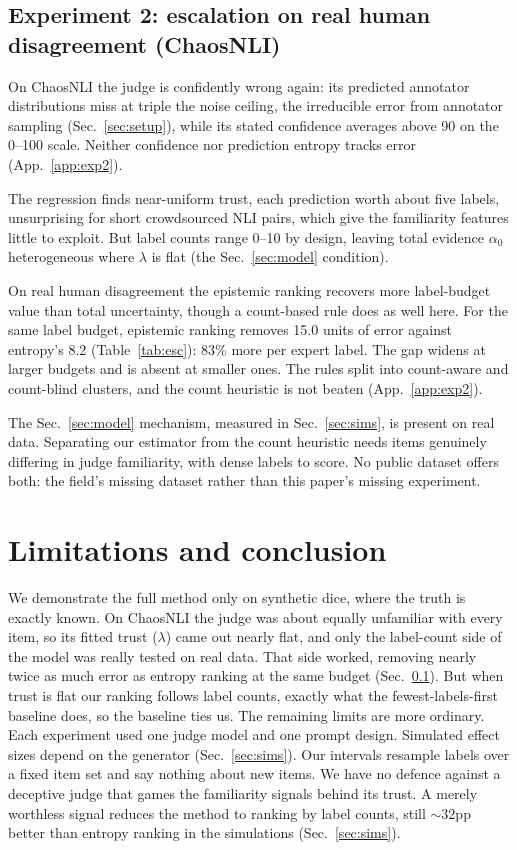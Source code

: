 \documentclass{article}
\newcommand{\secref}[1]{Sec.~\ref{#1}}
\begin{document}
\subsection{Experiment 2: escalation on real human disagreement (ChaosNLI)}
\label{sec:exp2}

On ChaosNLI the judge is confidently wrong again: its predicted annotator
distributions miss at triple the noise ceiling, the irreducible error from
annotator sampling (\secref{sec:setup}), while its stated confidence
averages above 90 on the 0--100 scale. Neither confidence nor prediction
entropy tracks error (App.~\ref{app:exp2}).

The regression finds near-uniform trust, each prediction worth about five
labels, unsurprising for short crowdsourced NLI pairs, which give the
familiarity features little to exploit. But label counts range 0--10 by design,
leaving total evidence $\alpha_0$ heterogeneous where $\lambda$ is flat (the
\secref{sec:model} condition).

On real human disagreement the epistemic ranking recovers more label-budget
value than total uncertainty, though a count-based rule does as well here.
For the same label budget, epistemic ranking removes 15.0 units of error
against entropy's 8.2 (Table~\ref{tab:esc}): 83\% more per expert label. The
gap widens at larger budgets and is absent at smaller ones. The rules split into
count-aware and count-blind clusters, and the count heuristic is not beaten
(App.~\ref{app:exp2}).

The \secref{sec:model} mechanism, measured in \secref{sec:sims}, is present on
real data. Separating our estimator from the count heuristic needs items genuinely
differing in judge familiarity, with dense labels to score. No public
dataset offers both: the field's missing dataset rather than this paper's missing
experiment.

\section{Limitations and conclusion}
\label{sec:limitations}

We demonstrate the full method only on synthetic dice, where the truth is
exactly known. On ChaosNLI the judge was about equally unfamiliar with every
item, so its fitted trust ($\lambda$) came out nearly flat, and only the
label-count side of the model was really tested on real data. That side
worked, removing nearly twice as much error as entropy ranking at the same
budget (\secref{sec:exp2}). But when trust is flat our ranking follows label
counts, exactly what the fewest-labels-first baseline does, so the baseline
ties us. The remaining limits are more ordinary. Each experiment used one
judge model and one prompt design. Simulated effect sizes depend on the
generator (\secref{sec:sims}). Our intervals resample labels over a fixed
item set and say nothing about new items. We have no defence against a
deceptive judge that games the familiarity signals behind its trust. A merely
worthless signal reduces the method to ranking by label counts, still
${\sim}32$pp better than entropy ranking in the simulations
(\secref{sec:sims}).
\end{document}
